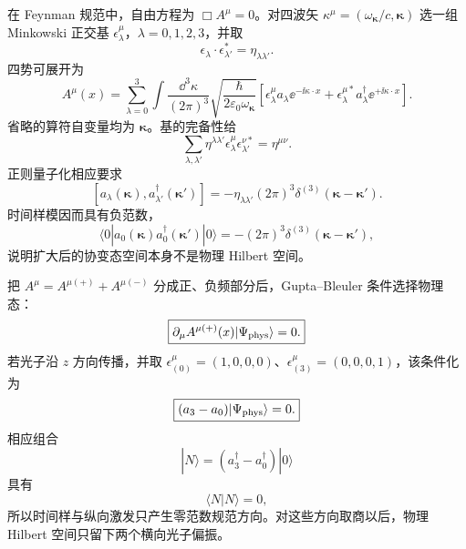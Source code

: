 在 Feynman 规范中，自由方程为 $\Box A^\mu=0$。对四波矢 $\kappa^\mu=(\omega_{\boldsymbol\kappa}/c,\boldsymbol\kappa)$ 选一组 Minkowski 正交基 $\epsilon_\lambda^\mu$，$\lambda=0,1,2,3$，并取
\begin{equation}
 \epsilon_\lambda\cdot\epsilon_{\lambda'}^*=\eta_{\lambda\lambda'}.
 \label{eq:fourpol-orthonormal-r13}
\end{equation}
四势可展开为
\begin{equation}
 A^\mu(x)=
 \sum_{\lambda=0}^{3}
 \int\frac{\dd^3 \kappa}{(2\pi)^3}
 \sqrt{\frac{\hbar}{2\varepsilon_0\omega_{\boldsymbol\kappa}}}
 \left[
 \epsilon_\lambda^\mu a_\lambda \ee^{-\ii\kappa\cdot x}
 +\epsilon_\lambda^{\mu *}a_\lambda^\dagger \ee^{+\ii\kappa\cdot x}
 \right].
 \label{eq:covariant-photon-fourpol-r7}
\end{equation}
省略的算符自变量均为 $\boldsymbol\kappa$。基的完备性给
\begin{equation}
 \boxed{
 \sum_{\lambda,\lambda'}
 \eta^{\lambda\lambda'}
 \epsilon_\lambda^\mu\epsilon_{\lambda'}^{\nu *}
 =\eta^{\mu\nu}.}
 \label{eq:fourpol-completeness-r7}
\end{equation}
正则量子化相应要求
\begin{equation}
 \boxed{
 [a_\lambda(\boldsymbol\kappa),a_{\lambda'}^\dagger(\boldsymbol\kappa')]
 =-\eta_{\lambda\lambda'}(2\pi)^3
 \delta^{(3)}(\boldsymbol\kappa-\boldsymbol\kappa').}
 \label{eq:covariant-photon-mode-comm-r7}
\end{equation}
时间样模因而具有负范数，
\begin{equation}
 \langle0|a_0(\boldsymbol\kappa)a_0^\dagger(\boldsymbol\kappa')|0\rangle
 =-(2\pi)^3\delta^{(3)}(\boldsymbol\kappa-\boldsymbol\kappa'),
 \label{eq:timelike-negative-norm-r7}
\end{equation}
说明扩大后的协变态空间本身不是物理 Hilbert 空间。

把 $A^\mu=A^{\mu(+)}+A^{\mu(-)}$ 分成正、负频部分后，Gupta--Bleuler 条件选择物理态：
\begin{equation}
 \boxed{
 \partial_\mu A^{\mu(+)}(x)|\Psi_{\rm phys}\rangle=0.}
 \label{eq:gupta-bleuler-r2}
\end{equation}
若光子沿 $z$ 方向传播，并取 $\epsilon_{(0)}^\mu=(1,0,0,0)$、$\epsilon_{(3)}^\mu=(0,0,0,1)$，该条件化为
\begin{equation}
 \boxed{(a_3-a_0)|\Psi_{\rm phys}\rangle=0.}
 \label{eq:GB-mode-condition-r7}
\end{equation}
相应组合
\begin{equation*}
 |N\rangle=(a_3^\dagger-a_0^\dagger)|0\rangle
\end{equation*}
具有
\begin{equation}
 \boxed{\langle N|N\rangle=0,}
 \label{eq:GB-null-state-r7}
\end{equation}
所以时间样与纵向激发只产生零范数规范方向。对这些方向取商以后，物理 Hilbert 空间只留下两个横向光子偏振。

